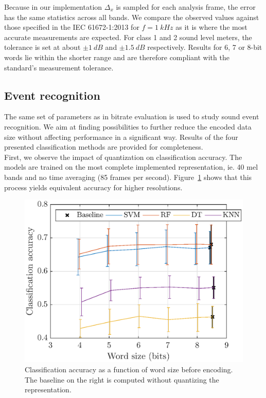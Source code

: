 \documentclass[final,3p,times,twocolumn]{elsarticle}
\begin{document}
Because in our implementation $\Delta_x$ is sampled for each analysis frame, the error has the same statistics across all bands. We compare the observed values against those specified in the IEC 61672-1:2013 for $f = 1~kHz$ as it is where the most accurate measurements are expected. For class 1 and 2 sound level meters, the tolerance is set at about $\pm 1~dB$ and $\pm 1.5~dB$ respectively. Results for 6, 7 or 8-bit words lie within the shorter range and are therefore compliant with the standard's measurement tolerance.

\subsection{Event recognition}

The same set of parameters as in bitrate evaluation is used to study sound event recognition. We aim at finding possibilities to further reduce the encoded data size without affecting performance in a significant way. Results of the four presented classification methods are provided for completeness.\\

First, we observe the impact of quantization on classification accuracy. The models are trained on the most complete implemented representation, ie. 40 mel bands and no time averaging (85 frames per second). Figure~\ref{fig:class_mel_q} shows that this process yields equivalent accuracy for higher resolutions.\\

\begin{figure}[htbp]
	\centering
		\includegraphics[width=\columnwidth]{class_mel_q.eps}
	\caption{Classification accuracy as a function of word size before encoding. The baseline on the right is computed without quantizing the representation.}
	\label{fig:class_mel_q}
\end{figure}
\end{document}

